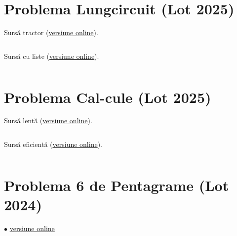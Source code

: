 \documentclass[../main.tex]{subfiles}
\begin{document}
\inputminted{cpp}{../src/assorted/scurtcircuit.cpp}


\section{Problema Lungcircuit (Lot 2025)}
\label{code:lungcircuit}

Sursă tractor (\href{https://kilonova.ro/submissions/819693}{versiune online}).

\inputminted{cpp}{../src/assorted/lungcircuit-tractor.cpp}

Sursă cu liste (\href{https://kilonova.ro/submissions/819679}{versiune online}).

\inputminted{cpp}{../src/assorted/lungcircuit-lists.cpp}


\section{Problema Cal-cule (Lot 2025)}
\label{code:cal-cule}

Sursă lentă (\href{https://kilonova.ro/submissions/772169}{versiune online}).

\inputminted{cpp}{../src/assorted/cal-cule-slow.cpp}

Sursă eficientă (\href{https://kilonova.ro/submissions/772548}{versiune online}).

\inputminted{cpp}{../src/assorted/cal-cule-fast.cpp}


\section{Problema 6 de Pentagrame (Lot 2024)}
\label{code:6-de-pentagrame}
$\bullet$
\href{https://kilonova.ro/submissions/376725}{versiune online}

\inputminted{cpp}{../src/assorted/6-de-pentagrame.cpp}
\end{document}
